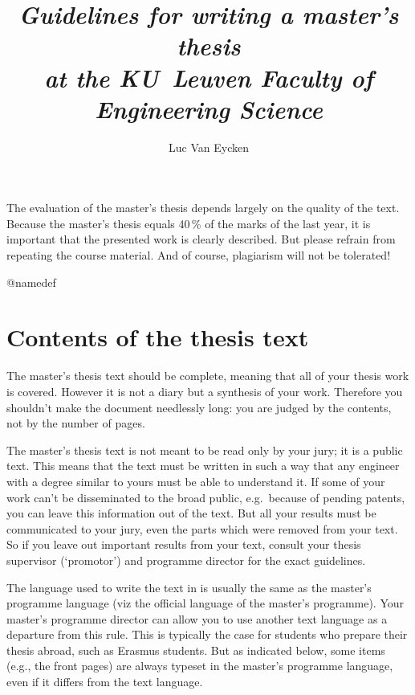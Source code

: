 \documentclass[11pt,article,oneside,a4paper]{memoir}
\newcommand\Dutch[1]{`\foreignlanguage{dutch}{#1}'}
\begin{document}
\title{\itshape Guidelines for writing a master's thesis \\
  at the KU~Leuven Faculty of Engineering Science}
\author{Luc Van Eycken}
\maketitle
\bigskip

\noindent The evaluation of the master's thesis depends largely on the
quality of the text. Because the master's thesis equals 40\,\% of the marks
of the last year, it is important that the presented work is clearly
described. But please refrain from repeating the course material. And of
course, plagiarism will not be tolerated!

\medskip
\csname @namedef
\tableofcontents*
\medskip

\chapter{Contents of the thesis text}
The master's thesis text should be complete, meaning that all of your thesis
work is covered. However it is not a diary but a synthesis of your work.
Therefore you shouldn't make the document needlessly long: you are judged
by the contents, not by the number of pages.

The master's thesis text is not meant to be read only by your jury; it is a
public text. This means that the text must be written in such a way that
any engineer with a degree similar to yours must be able to understand it.
If some of your work can't be disseminated to the broad public, e.g.\
because of pending patents, you can leave this information out of the text.
But all your results must be communicated to your jury, even the parts
which were removed from your text. So if you leave out important results
from your text, consult your thesis supervisor (\Dutch{promotor}) and
programme director for the exact guidelines.

The language used to write the text in is usually the same as the master's
programme language (viz the official language of the master's programme). Your
master's programme director can allow you to use another text language as a
departure from this rule. This is typically the case for students who prepare
their thesis abroad, such as Erasmus students. But as indicated below, some
items (e.g., the front pages) are always typeset in the master's programme
language, even if it differs from the text language.
\end{document}
